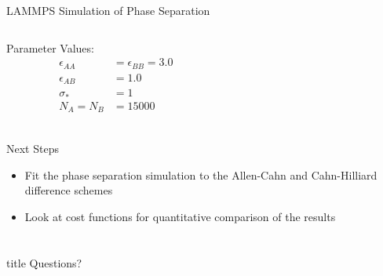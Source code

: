 \documentclass[professionalfont]{beamer}
\theoremstyle{remark}
\begin{document}
\begin{frame}{LAMMPS Simulation of Phase Separation}

	\begin{columns}

		\begin{column}{.33\paperwidth}
		
			Parameter Values:
			\begin{align*}
				\epsilon_{AA} &=\epsilon_{BB} =3.0\\
				\epsilon_{AB}&=1.0\\
				\sigma_*&=1\\
				N_A=N_B&=15000\\
			\end{align*}

		\end{column}

		\begin{column}{.62\paperwidth}

			\vspace{-12pt}
			\begin{figure}
				\centering
			\end{figure}
		\end{column}

	\end{columns}	

\end{frame}

\begin{frame}{Next Steps}

	\begin{itemize}
		\item Fit the phase separation simulation to the Allen-Cahn and Cahn-Hilliard difference schemes
		\item Look at cost functions for quantitative comparison of the results
	\end{itemize}

	\begin{figure}
	\end{figure}
	
\end{frame}

\section*{}

\begin{frame}
	\vfill
	\centering
	\begin{beamercolorbox}[sep=8pt,center,shadow=true,rounded=true]{title}
	Questions?
	\end{beamercolorbox}
	\vfill
\end{frame}
\end{document}
